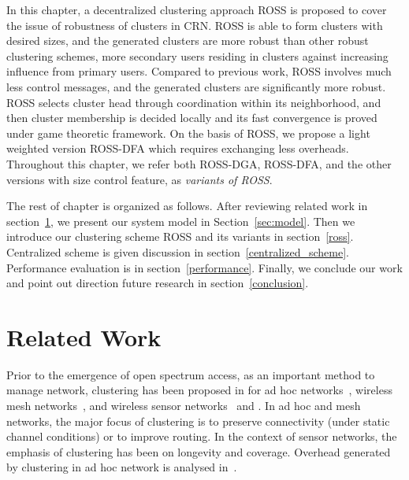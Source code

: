 In this chapter, a decentralized clustering approach ROSS is proposed to cover the issue of robustness of clusters in CRN.
ROSS is able to form clusters with desired sizes, and the generated clusters are more robust than other robust clustering schemes, \ie more secondary users residing in clusters against increasing influence from primary users.
Compared to previous work, ROSS involves much less control messages, and the generated clusters are significantly more robust.
ROSS selects cluster head through coordination within its neighborhood, and then cluster membership is decided locally and its fast convergence is proved under game theoretic framework. 
On the basis of ROSS, we propose a light weighted version \gls{ROSS-DFA} which requires exchanging less overheads.
Throughout this chapter, we refer both \gls{ROSS-DGA}, ROSS-DFA, and the other versions with size control feature, as \textit{variants of ROSS}. 

The rest of chapter is organized as follows. 
After reviewing related work in section~\ref{related_work}, we present our system model in Section~\ref{sec:model}. 
Then we introduce our clustering scheme ROSS and its variants in section~\ref{ross}.
Centralized scheme is given discussion in section~\ref{centralized_scheme}.
Performance evaluation is in section~\ref{performance}.
Finally, we conclude our work and point out direction future research in section~\ref{conclusion}.


\section{Related Work}
\label{related_work}

Prior to the emergence of open spectrum access, as an important method to manage network, clustering has been proposed in for ad hoc networks~\cite{Kawadia03,Lin97adaptiveclustering,Basagni99}, wireless mesh networks~\cite{Abbasi_survey_07}, and wireless sensor networks~\cite{Abbasi_survey_07} and . 
In ad hoc and mesh networks, the major focus of clustering is to preserve connectivity (under static channel conditions) or to improve routing.
In the context of sensor networks, the emphasis of clustering has been on longevity and coverage.
Overhead generated by clustering in ad hoc network is analysed in~\cite{clusterRoutingOverhead02infocom, clusterRoutingOverhead_wcnc04}.



